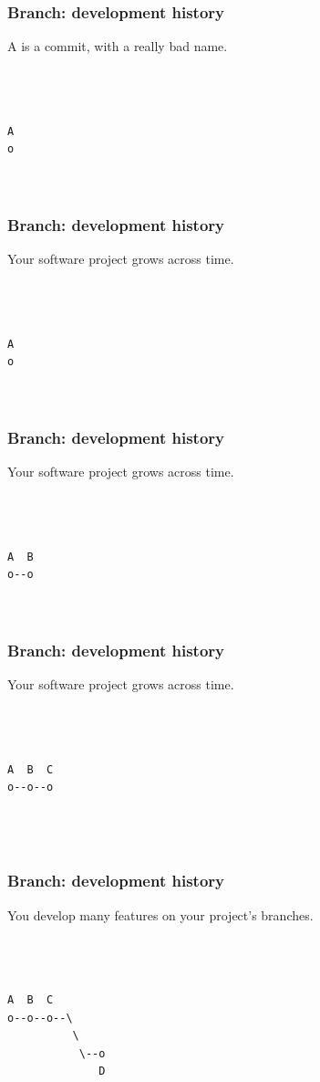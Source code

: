 \documentclass[unknownkeysallowed]{beamer}
\begin{document}
\begin{frame}[fragile]
	\frametitle{Branch: development history}
	A is a commit, with a really bad name.

\begin{verbatim}



A  
o



\end{verbatim}
\end{frame}

\begin{frame}[fragile]
	\frametitle{Branch: development history}
	Your software project grows across time.
\begin{verbatim}



A  
o



\end{verbatim}
\end{frame}

\begin{frame}[fragile]
	\frametitle{Branch: development history}
	    Your software project grows across time.
\begin{verbatim}



A  B
o--o
   


\end{verbatim}
\end{frame}

\begin{frame}[fragile]
	\frametitle{Branch: development history}
	    Your software project grows across time.
\begin{verbatim}



A  B  C
o--o--o
      
     
    
\end{verbatim}
\end{frame}

\begin{frame}[fragile]
	\frametitle{Branch: development history}
	You develop many features on your project's branches.
\begin{verbatim}



A  B  C  
o--o--o--\
          \ 
           \--o
              D
\end{verbatim}
\end{frame}
\end{document}
